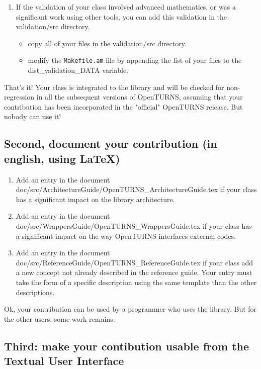 \documentclass[11pt]{article}
\begin{document}
\begin{enumerate}
\item If the validation of your class involved advanced mathematics, or was a significant work using other tools, you can add this validation in the validation/src directory.
  \begin{itemize}
  \item copy all of your files in the validation/src directory.
  \item modify the \verb!Makefile.am! file by appending the list of your files to the dist\_validation\_DATA variable.
  \end{itemize}
  \setcounter{oldenumi}{\value{enumi}}
\end{enumerate}

That's it! Your class is integrated to the library and will be checked for non-regression in all the subsequent versions of OpenTURNS, assuming that your contribution has been incorporated in the "official" OpenTURNS release. But nobody can use it!

\subsection{Second, document your contribution (in english, using LaTeX)}

\begin{enumerate}
  \setcounter{enumi}{\value{oldenumi}}
\item Add an entry in the document doc/src/ArchitectureGuide/OpenTURNS\_ArchitectureGuide.tex if your class has a significant impact on the library architecture.
  
\item Add an entry in the document doc/src/WrappersGuide/OpenTURNS\_WrappersGuide.tex if your class has a significant impact on the way OpenTURNS interfaces external codes.
  
\item Add an entry in the document doc/src/ReferenceGuide/OpenTURNS\_ReferenceGuide.tex if your class add a new concept not already described in the reference guide. Your entry must take the form of a specific description using the same template than the other descriptions.
  \setcounter{oldenumi}{\value{enumi}}
\end{enumerate}

Ok, your contribution can be used by a programmer who uses the library. But for the other users, some work remains.

\subsection{Third: make your contibution usable from the Textual User Interface}
\end{document}
